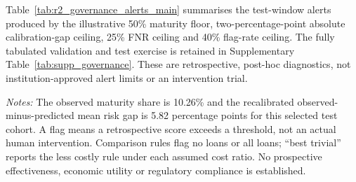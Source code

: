 \documentclass[10pt]{article}
\begin{document}
Table~\ref{tab:r2_governance_alerts_main} summarises the test-window alerts produced by the illustrative 50\% maturity floor, two-percentage-point absolute calibration-gap ceiling, 25\% FNR ceiling and 40\% flag-rate ceiling. The fully tabulated validation and test exercise is retained in Supplementary Table~\ref{tab:supp_governance}. These are retrospective, post-hoc diagnostics, not institution-approved alert limits or an intervention trial.

\begin{table}[!ht]
\centering
\caption{Illustrative retrospective governance alerts for the selected test cohort. All limits are post-hoc examples; costs are unobserved classification-loss proxies, not human-review expenditure.}
\label{tab:r2_governance_alerts_main}
\vspace{2pt}
{\footnotesize \textit{Notes:} The observed maturity share is 10.26\% and the recalibrated observed-minus-predicted mean risk gap is 5.82 percentage points for this selected test cohort. A flag means a retrospective score exceeds a threshold, not an actual human intervention. Comparison rules flag no loans or all loans; ``best trivial'' reports the less costly rule under each assumed cost ratio. No prospective effectiveness, economic utility or regulatory compliance is established.}
\end{table}
\end{document}
